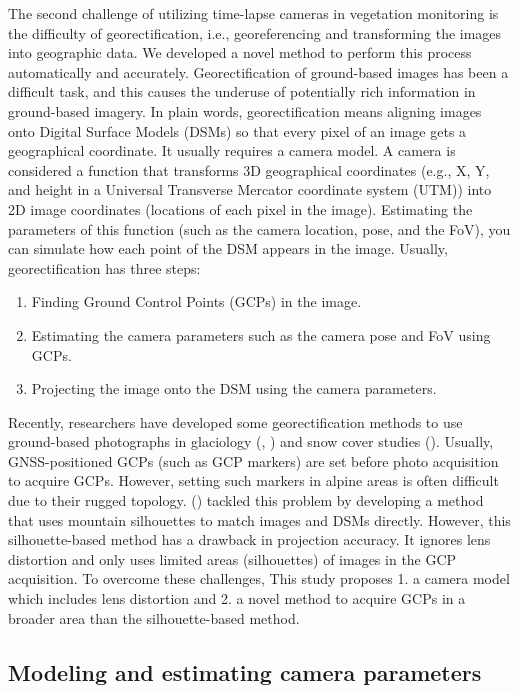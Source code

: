 \documentclass{article}
\providecommand{\tightlist}{%
  \setlength{\itemsep}{0pt}\setlength{\parskip}{0pt}}
\begin{document}
The second challenge of utilizing time-lapse cameras in vegetation monitoring is the difficulty of georectification, i.e., georeferencing and transforming the images into geographic data. We developed a novel method to perform this process automatically and accurately. Georectification of ground-based images has been a difficult task, and this causes the underuse of potentially rich information in ground-based imagery. In plain words, georectification means aligning images onto Digital Surface Models (DSMs) so that every pixel of an image gets a geographical coordinate. It usually requires a camera model. A camera is considered a function that transforms 3D geographical coordinates (e.g., X, Y, and height in a Universal Transverse Mercator coordinate system (UTM)) into 2D image coordinates (locations of each pixel in the image). Estimating the parameters of this function (such as the camera location, pose, and the FoV), you can simulate how each point of the DSM appears in the image. Usually, georectification has three steps:

\begin{enumerate}
\def\labelenumi{\arabic{enumi}.}
\tightlist
\item
  Finding Ground Control Points (GCPs) in the image.
\item
  Estimating the camera parameters such as the camera pose and FoV using GCPs.
\item
  Projecting the image onto the DSM using the camera parameters.
\end{enumerate}

Recently, researchers have developed some georectification methods to use ground-based photographs in glaciology (\cite{Messerli2015GeoInst}, \cite{Hulton2020PyTrx}) and snow cover studies (\cite{Portenier2020Cryosphere}). Usually, GNSS-positioned GCPs (such as GCP markers) are set before photo acquisition to acquire GCPs. However, setting such markers in alpine areas is often difficult due to their rugged topology. (\cite{Portenier2020Cryosphere}) tackled this problem by developing a method that uses mountain silhouettes to match images and DSMs directly. However, this silhouette-based method has a drawback in projection accuracy. It ignores lens distortion and only uses limited areas (silhouettes) of images in the GCP acquisition. To overcome these challenges, This study proposes 1. a camera model which includes lens distortion and 2. a novel method to acquire GCPs in a broader area than the silhouette-based method.

\hypertarget{modeling-and-estimating-camera-parameters}{%
\subsection{Modeling and estimating camera parameters}\label{modeling-and-estimating-camera-parameters}}
\end{document}
